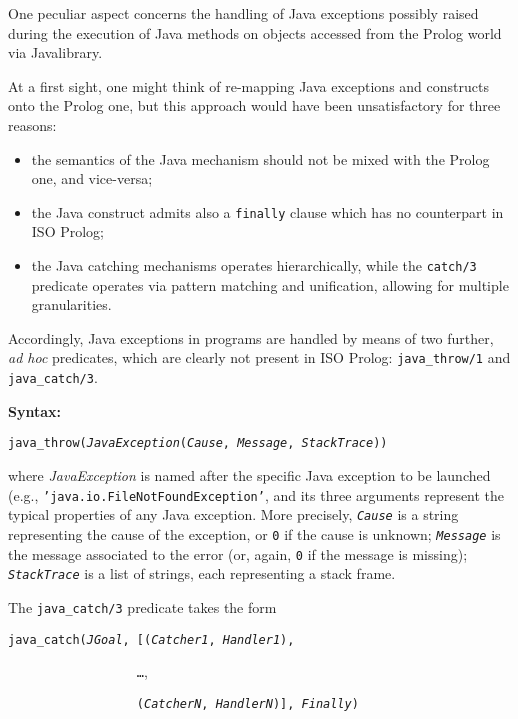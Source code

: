 One peculiar \tuprolog{} aspect concerns the handling of Java exceptions possibly raised during the execution of Java methods on objects accessed from the Prolog world via Javalibrary.

At a first sight, one might think of re-mapping Java exceptions and constructs onto the Prolog one, but this approach would have been unsatisfactory for three reasons:
%
\begin{itemize}
  \item the semantics of the Java mechanism should not be mixed with the Prolog one, and vice-versa;

  \item the Java construct admits also a \texttt{finally} clause which has no counterpart in ISO Prolog;

  \item the Java catching mechanisms operates hierarchically, while the \texttt{catch/3} predicate operates via pattern matching and unification, allowing for multiple granularities.
\end{itemize}

\noindent Accordingly, Java exceptions in \tuprolog{} programs are handled by means of two further, \textit{ad hoc} predicates, which are clearly not present in ISO Prolog: \texttt{java\_throw/1} and \texttt{java\_catch/3}.

\medskip

\noindent\textbf{Syntax:}

 \texttt{java\_throw(\textit{JavaException}(\textit{Cause}, \textit{Message}, \textit{StackTrace}))}

\medskip
\noindent where \textit{JavaException} is named after the specific Java exception to be launched
(e.g., \texttt{'java.io.FileNotFoundException'}, and its three arguments represent the typical
properties of any Java exception. More precisely, \texttt{\textit{Cause}} is a string representing
the cause of the exception, or \texttt{0} if the cause is unknown; \texttt{\textit{Message}} is
the message associated to the error (or, again, \texttt{0} if the message is missing);
\texttt{\textit{StackTrace}} is a list of strings, each representing a stack frame.

The \texttt{java\_catch/3} predicate takes the form
\medskip

 \texttt{java\_catch(\textit{JGoal}, [(\textit{Catcher1}, \textit{Handler1}),}

 \texttt{\mbox{~~~~~~~~~~~~~~~~~~}\ldots},

 \texttt{\mbox{~~~~~~~~~~~~~~~~~~}(\textit{CatcherN}, \textit{HandlerN})], \textit{Finally})}

